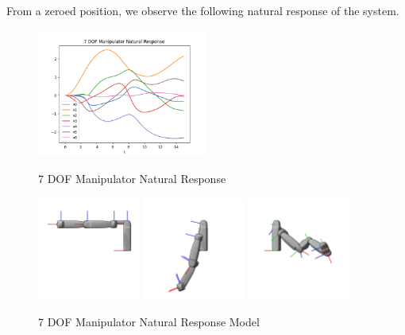 \noindent From a zeroed position, we observe the following natural response of the system.

\begin{figure}[H]
    \centering
    \includegraphics[width=0.5\textwidth]{Figures/Examples/7DOF/NaturalResponse.png}
    \caption{7 DOF Manipulator Natural Response}
    \label{fig:HighDOFNat}
    \includegraphics[width=0.3\textwidth]{Figures/Examples/7DOF/Frame0WithFrames.png}
    \includegraphics[width=0.3\textwidth]{Figures/Examples/7DOF/Frame50WithFrames.png}
    \includegraphics[width=0.3\textwidth]{Figures/Examples/7DOF/Frame100WithFrames.png}
    \caption{7 DOF Manipulator Natural Response Model}
\end{figure}

